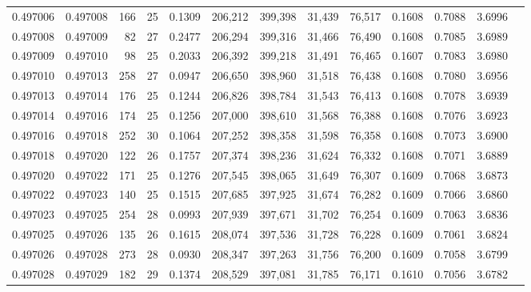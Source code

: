 \begin{tabular}{rrrrrrrrrrrrr}
0.497006 & 0.497008 & 166 &  25 &                                     0.1309 & 206,212 & 399,398 &  31,439 &  76,517 & 0.1608 & 0.7088 & 3.6996 \\
0.497008 & 0.497009 &  82 &  27 &                                     0.2477 & 206,294 & 399,316 &  31,466 &  76,490 & 0.1608 & 0.7085 & 3.6989 \\
0.497009 & 0.497010 &  98 &  25 &                                     0.2033 & 206,392 & 399,218 &  31,491 &  76,465 & 0.1607 & 0.7083 & 3.6980 \\
0.497010 & 0.497013 & 258 &  27 &                                     0.0947 & 206,650 & 398,960 &  31,518 &  76,438 & 0.1608 & 0.7080 & 3.6956 \\
0.497013 & 0.497014 & 176 &  25 &                                     0.1244 & 206,826 & 398,784 &  31,543 &  76,413 & 0.1608 & 0.7078 & 3.6939 \\
0.497014 & 0.497016 & 174 &  25 &                                     0.1256 & 207,000 & 398,610 &  31,568 &  76,388 & 0.1608 & 0.7076 & 3.6923 \\
0.497016 & 0.497018 & 252 &  30 &                                     0.1064 & 207,252 & 398,358 &  31,598 &  76,358 & 0.1608 & 0.7073 & 3.6900 \\
0.497018 & 0.497020 & 122 &  26 &                                     0.1757 & 207,374 & 398,236 &  31,624 &  76,332 & 0.1608 & 0.7071 & 3.6889 \\
0.497020 & 0.497022 & 171 &  25 &                                     0.1276 & 207,545 & 398,065 &  31,649 &  76,307 & 0.1609 & 0.7068 & 3.6873 \\
0.497022 & 0.497023 & 140 &  25 &                                     0.1515 & 207,685 & 397,925 &  31,674 &  76,282 & 0.1609 & 0.7066 & 3.6860 \\
0.497023 & 0.497025 & 254 &  28 &                                     0.0993 & 207,939 & 397,671 &  31,702 &  76,254 & 0.1609 & 0.7063 & 3.6836 \\
0.497025 & 0.497026 & 135 &  26 &                                     0.1615 & 208,074 & 397,536 &  31,728 &  76,228 & 0.1609 & 0.7061 & 3.6824 \\
0.497026 & 0.497028 & 273 &  28 &                                     0.0930 & 208,347 & 397,263 &  31,756 &  76,200 & 0.1609 & 0.7058 & 3.6799 \\
0.497028 & 0.497029 & 182 &  29 &                                     0.1374 & 208,529 & 397,081 &  31,785 &  76,171 & 0.1610 & 0.7056 & 3.6782 \\

\end{tabular}
